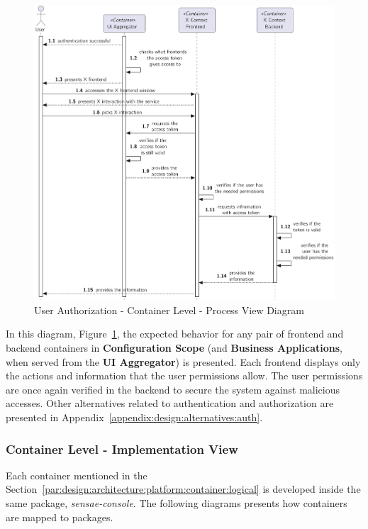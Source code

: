 \begin{figure}[H]
   \centering
   \includegraphics[page=1,width=0.8\columnwidth]{assets/diagrams/design/architectural/level2/process/user-authorization.pdf}
   \caption[User Authorization - Container Level - Process View Diagram]{User Authorization - Container Level - Process View Diagram}
   \label{fig:design:architecture:platform:container:process:diagram:authorization}
\end{figure}

In this diagram, Figure~\ref{fig:design:architecture:platform:container:process:diagram:authorization}, the expected behavior for any pair of frontend and backend containers in \textbf{Configuration Scope} (and \textbf{Business Applications}, when served from the \textbf{UI Aggregator}) is presented. Each frontend displays only the actions and information that the user permissions allow. The user permissions are once again verified in the backend to secure the system against malicious accesses. Other alternatives related to authentication and authorization are presented in  Appendix~\ref{appendix:design:alternatives:auth}.

\subsubsection{Container Level - Implementation View}
\label{par:design:architecture:platform:container:development}

Each container mentioned in the Section~\ref{par:design:architecture:platform:container:logical} is developed inside the same package, \textit{sensae-console}. The following diagrams presents how containers are mapped to packages.

